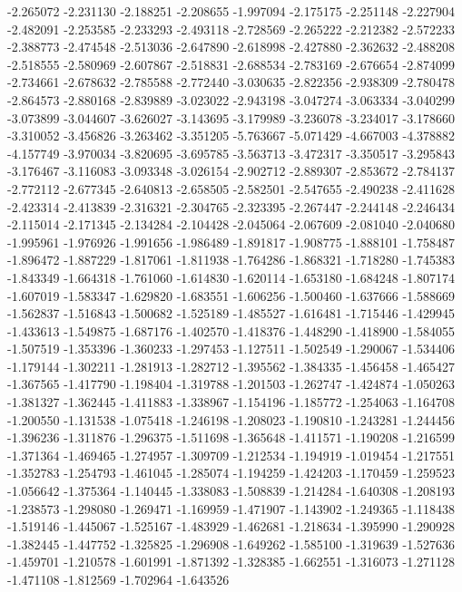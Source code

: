 -2.265072
-2.231130
-2.188251
-2.208655
-1.997094
-2.175175
-2.251148
-2.227904
-2.482091
-2.253585
-2.233293
-2.493118
-2.728569
-2.265222
-2.212382
-2.572233
-2.388773
-2.474548
-2.513036
-2.647890
-2.618998
-2.427880
-2.362632
-2.488208
-2.518555
-2.580969
-2.607867
-2.518831
-2.688534
-2.783169
-2.676654
-2.874099
-2.734661
-2.678632
-2.785588
-2.772440
-3.030635
-2.822356
-2.938309
-2.780478
-2.864573
-2.880168
-2.839889
-3.023022
-2.943198
-3.047274
-3.063334
-3.040299
-3.073899
-3.044607
-3.626027
-3.143695
-3.179989
-3.236078
-3.234017
-3.178660
-3.310052
-3.456826
-3.263462
-3.351205
-5.763667
-5.071429
-4.667003
-4.378882
-4.157749
-3.970034
-3.820695
-3.695785
-3.563713
-3.472317
-3.350517
-3.295843
-3.176467
-3.116083
-3.093348
-3.026154
-2.902712
-2.889307
-2.853672
-2.784137
-2.772112
-2.677345
-2.640813
-2.658505
-2.582501
-2.547655
-2.490238
-2.411628
-2.423314
-2.413839
-2.316321
-2.304765
-2.323395
-2.267447
-2.244148
-2.246434
-2.115014
-2.171345
-2.134284
-2.104428
-2.045064
-2.067609
-2.081040
-2.040680
-1.995961
-1.976926
-1.991656
-1.986489
-1.891817
-1.908775
-1.888101
-1.758487
-1.896472
-1.887229
-1.817061
-1.811938
-1.764286
-1.868321
-1.718280
-1.745383
-1.843349
-1.664318
-1.761060
-1.614830
-1.620114
-1.653180
-1.684248
-1.807174
-1.607019
-1.583347
-1.629820
-1.683551
-1.606256
-1.500460
-1.637666
-1.588669
-1.562837
-1.516843
-1.500682
-1.525189
-1.485527
-1.616481
-1.715446
-1.429945
-1.433613
-1.549875
-1.687176
-1.402570
-1.418376
-1.448290
-1.418900
-1.584055
-1.507519
-1.353396
-1.360233
-1.297453
-1.127511
-1.502549
-1.290067
-1.534406
-1.179144
-1.302211
-1.281913
-1.282712
-1.395562
-1.384335
-1.456458
-1.465427
-1.367565
-1.417790
-1.198404
-1.319788
-1.201503
-1.262747
-1.424874
-1.050263
-1.381327
-1.362445
-1.411883
-1.338967
-1.154196
-1.185772
-1.254063
-1.164708
-1.200550
-1.131538
-1.075418
-1.246198
-1.208023
-1.190810
-1.243281
-1.244456
-1.396236
-1.311876
-1.296375
-1.511698
-1.365648
-1.411571
-1.190208
-1.216599
-1.371364
-1.469465
-1.274957
-1.309709
-1.212534
-1.194919
-1.019454
-1.217551
-1.352783
-1.254793
-1.461045
-1.285074
-1.194259
-1.424203
-1.170459
-1.259523
-1.056642
-1.375364
-1.140445
-1.338083
-1.508839
-1.214284
-1.640308
-1.208193
-1.238573
-1.298080
-1.269471
-1.169959
-1.471907
-1.143902
-1.249365
-1.118438
-1.519146
-1.445067
-1.525167
-1.483929
-1.462681
-1.218634
-1.395990
-1.290928
-1.382445
-1.447752
-1.325825
-1.296908
-1.649262
-1.585100
-1.319639
-1.527636
-1.459701
-1.210578
-1.601991
-1.871392
-1.328385
-1.662551
-1.316073
-1.271128
-1.471108
-1.812569
-1.702964
-1.643526

